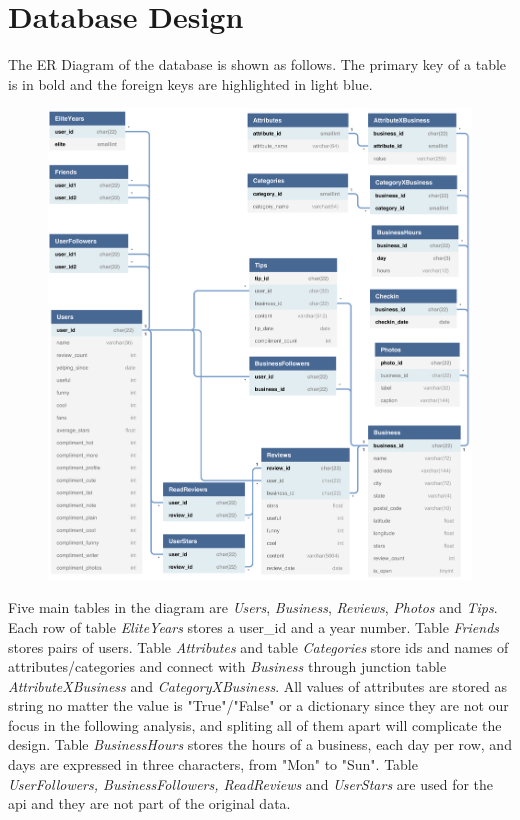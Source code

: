 \documentclass[12pt]{article}
\begin{document}
\section{Database Design}\label{section-dbdesign}
The ER Diagram of the database is shown as follows. The primary key of a table is in bold and the foreign keys are highlighted in light blue.
\begin{figure}[H]
\begin{center}
    \includegraphics[width=1.0\textwidth]{ER_Diagram.png}
\end{center}
\end{figure}
Five main tables in the diagram are {\it Users}, {\it Business}, {\it Reviews}, {\it Photos} and {\it Tips}. Each row of table {\it EliteYears} stores a user\_id and a year number. Table {\it Friends} stores pairs of users. Table {\it Attributes} and table {\it Categories} store ids and names of attributes/categories and connect with {\it Business} through junction table {\it AttributeXBusiness} and {\it CategoryXBusiness}. All values of attributes are stored as string no matter the value is "True"/"False" or a dictionary since they are not our focus in the following analysis, and spliting all of them apart will complicate the design. Table {\it BusinessHours} stores the hours of a business, each day per row, and days are expressed in three characters, from "Mon" to "Sun". Table {\it UserFollowers, BusinessFollowers, ReadReviews} and {\it UserStars} are used for the api and they are not part of the original data.
\end{document}
